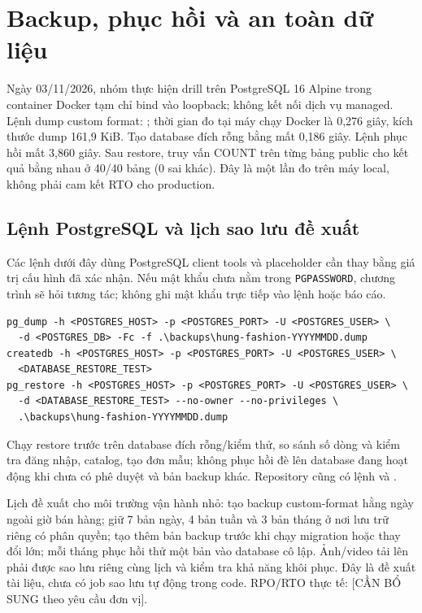 \section{Backup, phục hồi và an toàn dữ liệu}
\label{sec:backup-restore}
Ngày 03/11/2026, nhóm thực hiện drill trên PostgreSQL 16 Alpine trong container Docker tạm chỉ bind vào loopback; không kết nối dịch vụ managed. Lệnh dump custom format: \texttt{}; thời gian đo tại máy chạy Docker là 0,276 giây, kích thước dump 161,9 KiB. Tạo database đích rỗng bằng \texttt{} mất 0,186 giây. Lệnh phục hồi \texttt{} mất 3,860 giây. Sau restore, truy vấn COUNT trên từng bảng public cho kết quả bằng nhau ở 40/40 bảng (0 sai khác). Đây là một lần đo trên máy local, không phải cam kết RTO cho production.

\subsection{Lệnh PostgreSQL và lịch sao lưu đề xuất}
Các lệnh dưới đây dùng PostgreSQL client tools và placeholder cần thay bằng giá trị cấu hình đã xác nhận. Nếu mật khẩu chưa nằm trong \texttt{PGPASSWORD}, chương trình sẽ hỏi tương tác; không ghi mật khẩu trực tiếp vào lệnh hoặc báo cáo.
\begin{verbatim}
pg_dump -h <POSTGRES_HOST> -p <POSTGRES_PORT> -U <POSTGRES_USER> \
  -d <POSTGRES_DB> -Fc -f .\backups\hung-fashion-YYYYMMDD.dump
createdb -h <POSTGRES_HOST> -p <POSTGRES_PORT> -U <POSTGRES_USER> \
  <DATABASE_RESTORE_TEST>
pg_restore -h <POSTGRES_HOST> -p <POSTGRES_PORT> -U <POSTGRES_USER> \
  -d <DATABASE_RESTORE_TEST> --no-owner --no-privileges \
  .\backups\hung-fashion-YYYYMMDD.dump
\end{verbatim}
Chạy restore trước trên database đích rỗng/kiểm thử, so sánh số dòng và kiểm tra đăng nhập, catalog, tạo đơn mẫu; không phục hồi đè lên database đang hoạt động khi chưa có phê duyệt và bản backup khác. Repository cũng có lệnh \texttt{} và \texttt{}.

Lịch đề xuất cho môi trường vận hành nhỏ: tạo backup custom-format hằng ngày ngoài giờ bán hàng; giữ 7 bản ngày, 4 bản tuần và 3 bản tháng ở nơi lưu trữ riêng có phân quyền; tạo thêm bản backup trước khi chạy migration hoặc thay đổi lớn; mỗi tháng phục hồi thử một bản vào database cô lập. Ảnh/video tải lên phải được sao lưu riêng cùng lịch và kiểm tra khả năng khôi phục. Đây là đề xuất tài liệu, chưa có job sao lưu tự động trong code. RPO/RTO thực tế: [CẦN BỔ SUNG theo yêu cầu đơn vị].

